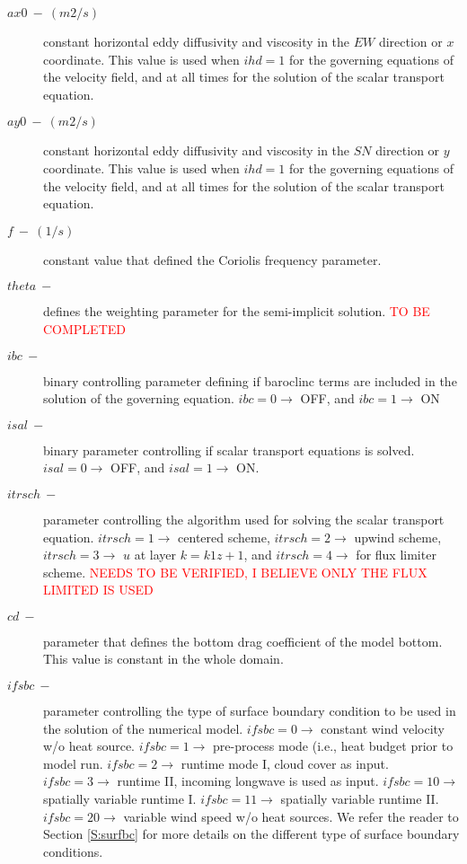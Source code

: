 \begin{description}
    \item [$ax0\ -\ (m2/s)$] constant horizontal eddy diffusivity and viscosity in the $EW$ direction or $x$ coordinate. This value is used when $ihd = 1$ for the governing equations of the velocity field, and at all times for the solution of the scalar transport equation.
    \item [$ay0\ -\ (m2/s)$] constant horizontal eddy diffusivity and viscosity in the $SN$ direction or $y$ coordinate. This value is used when $ihd = 1$ for the governing equations of the velocity field, and at all times for the solution of the scalar transport equation.
    \item [$f \ -\ (1/s)$] constant value that defined the Coriolis frequency parameter.
    \item [$ theta\ -$] defines the weighting parameter for the semi-implicit solution. \textcolor{red}{TO BE COMPLETED}
    \item [$ibc\ -$] binary controlling parameter defining if baroclinc terms are included in the solution of the governing equation. $ibc = 0 \rightarrow$ OFF, and $ibc = 1 \rightarrow$ ON
    \item [$isal\ -$] binary parameter controlling if scalar transport equations is solved. $isal = 0 \rightarrow$ OFF, and $isal = 1 \rightarrow$ ON.
    \item [$itrsch\ -$] parameter controlling the algorithm used for solving the scalar transport equation. $itrsch = 1 \rightarrow$ centered scheme, $itrsch = 2 \rightarrow$ upwind scheme, $itrsch = 3 \rightarrow$ $u$ at layer $k = k1z + 1$, and $itrsch = 4 \rightarrow$ for flux limiter scheme. \textcolor{red}{NEEDS TO BE VERIFIED, I BELIEVE ONLY THE FLUX LIMITED IS USED}
    \item [$cd\ -$] parameter that defines the bottom drag coefficient of the model bottom. This value is constant in the whole domain.
    \item [$ifsbc\ -$] parameter controlling the type of surface boundary condition to be used in the solution of the numerical model. $ifsbc = 0 \rightarrow$ constant wind velocity w/o heat source. $ifsbc = 1 \rightarrow$ pre-process mode (i.e., heat budget prior to model run. $ifsbc = 2 \rightarrow$ runtime mode I, cloud cover as input. $ifsbc = 3 \rightarrow$ runtime II, incoming longwave is used as input. $ifsbc = 10 \rightarrow$ spatially variable runtime I. $ifsbc = 11 \rightarrow$ spatially variable runtime II. $ifsbc = 20 \rightarrow$ variable wind speed w/o heat sources. We refer the reader to Section \ref{S:surfbc} for more details on the different type of surface boundary conditions.

\end{description}
